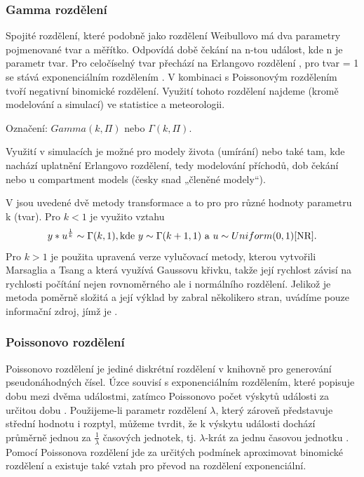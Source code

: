 \documentclass[a4paper,11pt]{article}
\begin{document}
\subsubsection{Gamma rozdělení}

Spojité rozdělení, které podobně jako rozdělení Weibullovo má dva parametry pojmenované tvar a měřítko. Odpovídá době čekání na n-tou událost, kde n je parametr tvar. Pro celočíselný tvar přechází na Erlangovo rozdělení \cite{Wiki2}, pro tvar = 1 se stává exponenciálním rozdělením \cite{Wgamma}. V kombinaci s Poissonovým rozdělením tvoří negativní binomické rozdělení. Využití tohoto rozdělení najdeme (kromě modelování a simulací) ve statistice a meteorologii. \cite{Wiki2}

Označení: $Gamma(k, \Pi)$ nebo $\Gamma(k,  \Pi)$.

Využití v simulacích je možné pro modely života (umírání) \cite{Wgamma} \cite{Wiki2} nebo také tam, kde nachází uplatnění Erlangovo rozdělení, tedy modelování příchodů, dob čekání nebo u compartment models (česky snad „členěné modely“).

V \cite{NR} jsou uvedené dvě metody transformace a to pro pro různé hodnoty parametru k (tvar). Pro $k < 1$ je využito vztahu $$y*u^{\frac{1}{k}} \sim \Gamma(k, 1), \text{kde } y \sim \Gamma(k+1, 1) \text{ a } u \sim Uniform(0, 1) \text{\cite{NR}}.$$ Pro $k > 1$ je použita upravená verze vylučovací metody, kterou vytvořili Marsaglia a Tsang a která využívá Gaussovu křivku, takže její rychlost závisí na rychlosti počítání nejen rovnoměrného ale i normálního rozdělení. Jelikož je metoda poměrně složitá a její výklad by zabral několikero stran, uvádíme pouze informační zdroj, jímž je \cite{Marsaglia}. 

\subsubsection{Poissonovo rozdělení}

Poissonovo rozdělení je jediné diskrétní rozdělení v knihovně pro generování pseudonáhodných čísel. Úzce souvisí s exponenciálním rozdělením, které popisuje dobu mezi dvěma událostmi, zatímco Poissonovo počet výskytů události za určitou dobu \cite{INM}. Použijeme-li parametr rozdělení $\lambda$, který zároveň představuje střední hodnotu i rozptyl, můžeme tvrdit, že k výskytu události dochází průměrně jednou za $\frac{1}{\lambda}$ časových jednotek, tj. $\lambda$-krát za jednu časovou jednotku \cite{INM}. Pomocí Poissonova rozdělení jde za určitých podmínek aproximovat binomické rozdělení \cite{INM} a existuje také vztah pro převod na rozdělení exponenciální.
\end{document}
